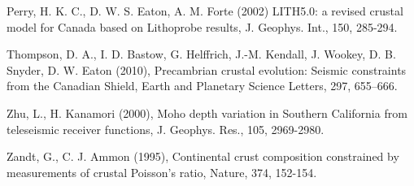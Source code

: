\documentclass[draft, 12pt]{article}
\begin{document}
Perry, H. K. C., D. W. S. Eaton, A. M. Forte (2002) LITH5.0: a revised crustal model for Canada based on Lithoprobe results,  J. Geophys. Int., 150, 285-294.

Thompson, D. A., I. D. Bastow, G. Helffrich, J.-M. Kendall, J. Wookey, D. B. Snyder, D. W. Eaton (2010), Precambrian crustal evolution: Seismic constraints from the Canadian Shield, Earth and Planetary Science Letters, 297, 655–666.

Zhu, L., H. Kanamori (2000), Moho depth variation in Southern California from teleseismic receiver functions, J. Geophys. Res., 105, 2969-2980.

Zandt, G., C. J. Ammon (1995), Continental crust composition constrained by measurements of crustal Poisson's ratio, Nature, 374, 152-154.
\end{document}
